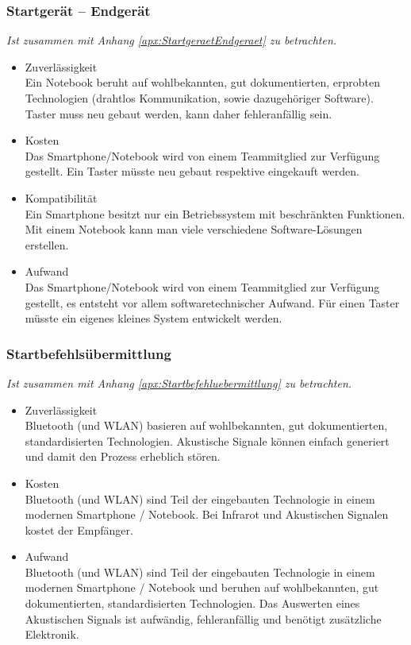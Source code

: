 		\subsubsection{Startgerät – Endgerät}
			\textit{Ist zusammen mit Anhang \ref{apx:StartgeraetEndgeraet} zu betrachten.}
			\begin{itemize}
				\item Zuverlässigkeit\\
				Ein Notebook beruht auf wohlbekannten, gut dokumentierten, erprobten Technologien (drahtlos Kommunikation, sowie dazugehöriger Software). Taster muss neu gebaut werden, kann daher fehleranfällig sein.
				\item Kosten\\
				Das Smartphone/Notebook wird von einem Teammitglied zur Verfügung gestellt. Ein Taster müsste neu gebaut respektive eingekauft werden.
				\item Kompatibilität\\
				Ein Smartphone besitzt nur ein Betriebssystem mit beschränkten Funktionen. Mit einem Notebook kann man viele verschiedene Software-Lösungen erstellen.
				\item Aufwand\\
				Das Smartphone/Notebook wird von einem Teammitglied zur Verfügung gestellt, es entsteht vor allem softwaretechnischer Aufwand. Für einen Taster müsste ein eigenes kleines System entwickelt werden.
			\end{itemize}
			
		\subsubsection{Startbefehlsübermittlung}
			\textit{Ist zusammen mit Anhang \ref{apx:Startbefehluebermittlung} zu betrachten.}
			\begin{itemize}
				\item Zuverlässigkeit\\
				Bluetooth (und WLAN) basieren auf wohlbekannten, gut dokumentierten, standardisierten Technologien. Akustische Signale können einfach generiert und damit den Prozess erheblich stören.
				\item Kosten\\
				Bluetooth (und WLAN) sind Teil der eingebauten Technologie in einem modernen Smartphone / Notebook. Bei Infrarot und Akustischen Signalen kostet der Empfänger.
				\item Aufwand\\
				Bluetooth (und WLAN) sind Teil der eingebauten Technologie in einem modernen Smartphone / Notebook und beruhen auf wohlbekannten, gut dokumentierten, standardisierten Technologien. Das Auswerten eines Akustischen Signals ist aufwändig, fehleranfällig und benötigt zusätzliche Elektronik.
			\end{itemize}	
			
